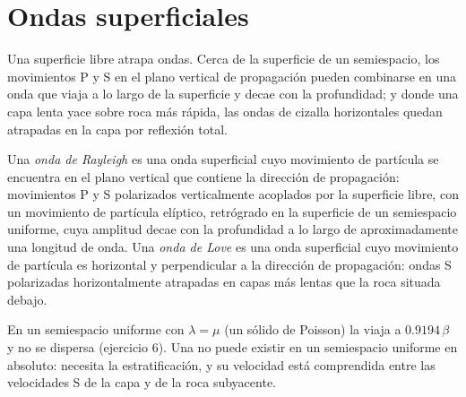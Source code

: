 \section{Ondas superficiales}

Una superficie libre atrapa ondas. Cerca de la superficie de un semiespacio, los movimientos P y S
en el plano vertical de propagación pueden combinarse en una onda que viaja a lo largo de la
superficie y decae con la profundidad; y donde una capa lenta yace sobre roca más rápida, las ondas
de cizalla horizontales quedan atrapadas en la capa por reflexión total.

\begin{definition}\label{def:b3:seismology-imaging:surface-waves}
Una \emph{onda de Rayleigh} es una onda superficial cuyo movimiento de
partícula se encuentra en el plano vertical que contiene la dirección de propagación:
movimientos P y S polarizados verticalmente acoplados por la superficie libre, con un
movimiento de partícula elíptico, retrógrado en la superficie de un semiespacio uniforme,
cuya amplitud decae con la profundidad a lo largo de aproximadamente una longitud de onda. Una \emph{onda de
Love} es una onda superficial cuyo movimiento de partícula es
horizontal y perpendicular a la dirección de propagación: ondas S polarizadas horizontalmente
atrapadas en capas más lentas que la roca situada debajo.
\end{definition}

En un semiespacio uniforme con $\lambda = \mu$ (un sólido de Poisson) la 
viaja a $0.9194\,\beta$ y no se dispersa (ejercicio 6). Una 
no puede existir en un semiespacio uniforme en absoluto: necesita la estratificación, y su
velocidad está comprendida entre las velocidades S de la capa y de la roca subyacente.

